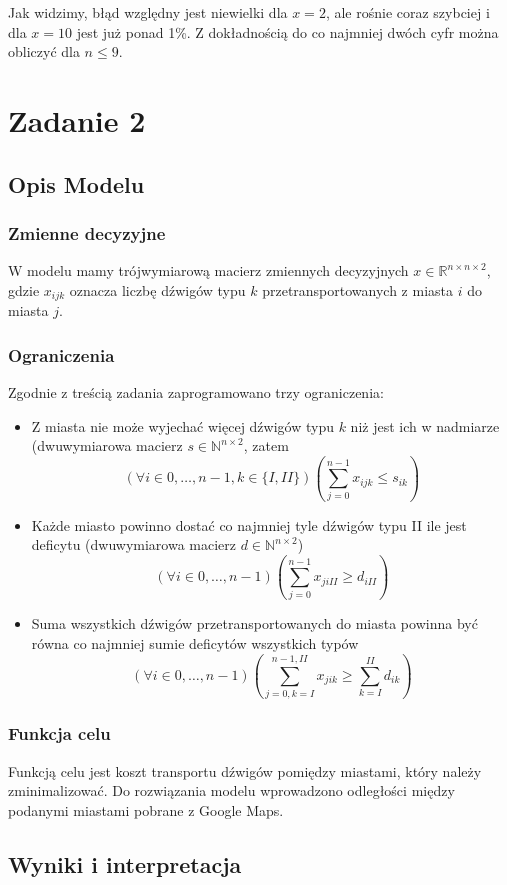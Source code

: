 \documentclass{article}
\begin{document}
Jak widzimy, błąd względny jest niewielki dla $x=2$, ale rośnie coraz szybciej i dla $x=10$ jest już ponad 1\%. Z dokładnością do co najmniej dwóch cyfr można obliczyć dla $n \leq 9$.

\section{Zadanie 2}
\subsection{Opis Modelu}
\subsubsection{Zmienne decyzyjne}
W modelu mamy trójwymiarową macierz zmiennych decyzyjnych $x \in \mathbb{R}^{n\times n\times 2}$, gdzie $x_{ijk}$ oznacza liczbę dźwigów typu $k$ przetransportowanych z miasta $i$ do miasta $j$.
\subsubsection{Ograniczenia}
Zgodnie z treścią zadania zaprogramowano trzy ograniczenia:
\begin{itemize}
	\item Z miasta nie może wyjechać więcej dźwigów typu $k$ niż jest ich w nadmiarze (dwuwymiarowa macierz $s \in \mathbb{N}^{n\times 2}$, zatem
	\[(\forall i \in {0,\dots,n-1}, k \in \{I,II\}) \left(\sum_{j=0}^{n-1}{x_{ijk} \leq s_{ik}}\right)\]
	\item Każde miasto powinno dostać co najmniej tyle dźwigów typu II ile jest deficytu (dwuwymiarowa macierz $d \in \mathbb{N}^{n\times 2}$)
	\[(\forall i \in {0,\dots,n-1}) \left(\sum_{j=0}^{n-1}{x_{jiII} \geq d_{iII}}\right)\]
	\item Suma wszystkich dźwigów przetransportowanych do miasta powinna być równa co najmniej sumie deficytów wszystkich typów
	\[(\forall i \in {0,\dots,n-1}) \left(\sum_{j=0,k=I}^{n-1,II}{x_{jik}} \geq \sum_{k=I}^{II}{d_{ik}}\right)\]
\end{itemize}
\subsubsection{Funkcja celu}
Funkcją celu jest koszt transportu dźwigów pomiędzy miastami, który należy zminimalizować. Do rozwiązania modelu wprowadzono odległości między podanymi miastami pobrane z Google Maps.
\subsection{Wyniki i interpretacja}
\end{document}
